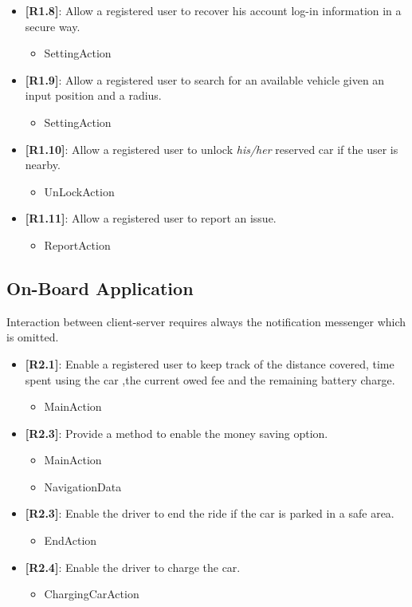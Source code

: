 \begin{itemize}
	\item{\textbf{[R1.8]}}: Allow a registered user to recover his account log-in information in a secure way.
	\begin{itemize}
	\item SettingAction
	\end{itemize}
	\item{\textbf{[R1.9]}}: Allow a registered user to search for an available vehicle given an input position and a radius.
	\begin{itemize}
	\item SettingAction
	\end{itemize}
	\item{\textbf{[R1.10]}}: Allow a registered user to unlock \emph{his/her} reserved car if the user is nearby.
	\begin{itemize}
	\item UnLockAction
	\end{itemize}
	\item \textbf{[R1.11]}: Allow a registered user to report an issue.
	\begin{itemize}
	\item ReportAction
	\end{itemize}
\end{itemize}

\subsection{On-Board Application}
Interaction between client-server requires always the notification messenger which is omitted.\\
\begin{itemize}
	\item{\textbf{[R2.1]}}: Enable a registered user to keep track of the distance covered, time spent using the car ,the current owed fee and the remaining battery charge.
	\begin{itemize}
	\item MainAction
	\end{itemize}
	\item{\textbf{[R2.3]}}: Provide a method to enable the money saving option.
	\begin{itemize}
	\item MainAction
	\item NavigationData
	\end{itemize}
	\item{\textbf{[R2.3]}}: Enable the driver to end the ride if the car is parked in a safe area.
	\begin{itemize}
	\item EndAction
	\end{itemize}
	\item \textbf{[R2.4]}: Enable the driver to charge the car.
	\begin{itemize}
	\item ChargingCarAction
	\end{itemize}
 \end{itemize}

